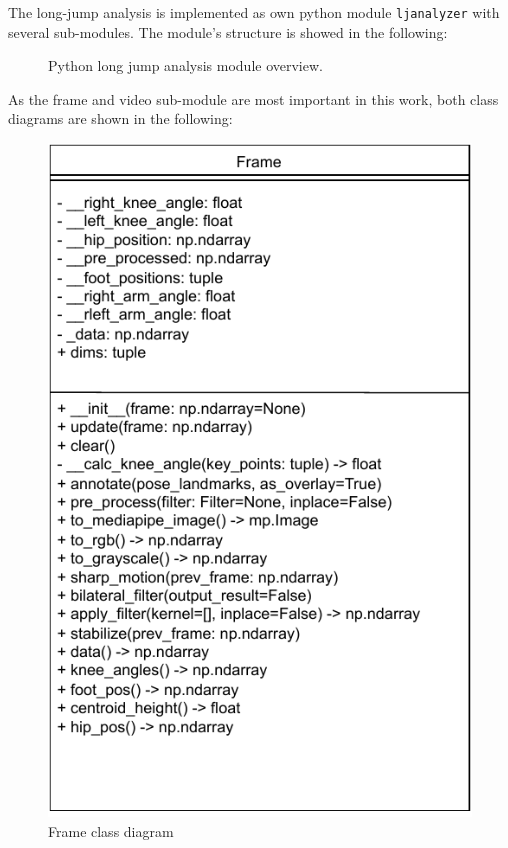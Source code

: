 The long-jump analysis is implemented as own python module \texttt{ljanalyzer}
with several sub-modules.
The module's structure is showed in the following:
\begin{figure}[h!]
    \centering
    \caption[Python analysis module overview]{Python long jump analysis module
    overview.}
    \label{fig:appendix_ljanalizer_overview}
\end{figure}
\FloatBarrier
\noindent As the frame and video sub-module are most important in this work,
both class diagrams are shown in the following:
\begin{figure}[htpb]
    \centering
    \includegraphics[scale=0.9]{frame_class.pdf}
    \caption[Frame class diagram]{Frame class diagram}
    \label{fig:appendix_frame_class}
\end{figure}

